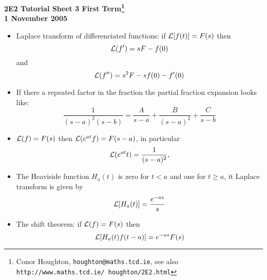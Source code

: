 \documentclass[12pt]{article}
\begin{document}
\begin{center}

{\bf 2E2 Tutorial Sheet 3 First Term\footnote{Conor Houghton, {\tt houghton@maths.tcd.ie}, see also {\tt http://www.maths.tcd.ie/ houghton/2E2.html}}\\[1cm] 1 November 2005}
\end{center}


\renewcommand{\labelenumi}{\arabic{enumi}.}
\begin{itemize}
\item Laplace transform of differenciated functions: if ${\cal L}[f(t)]=F(s)$ then
\begin{equation}
{\cal L}(f')=sF-f(0)
\end{equation}
and
\begin{equation}
{\cal L}(f'')=s^2F-sf(0)-f'(0)
\end{equation}                                

\item If there a repeated factor in the fraction the partial fraction expansion
looks like:
\begin{equation}
\frac{1}{(s-a)^2(s-b)}=\frac{A}{s-a}+\frac{B}{(s-a)^2}+\frac{C}{s-b}
\end{equation}

\item ${\cal L}(f)=F(s)$ then  ${\cal L}(e^{at}f)=F(s-a)$, in particular 
\begin{equation}
{\cal L}(e^{at}t)=\frac{1}{(s-a)^2},
\end{equation}

\item The Heaviside function $H_a(t)$ is zero for $t<a$ and one for $t\ge a$, it Laplace transform is given by
\begin{equation}
{\cal L}[H_a(t)]=\frac{e^{-as}}{s}
\end{equation}

\item The shift theorem: if ${\cal L}(f)=F(s)$ then
\begin{equation}
{\cal L}[H_a(t)f(t-a)]=e^{-as}F(s)
\end{equation}

\end{itemize}

\newpage

\end{document}
